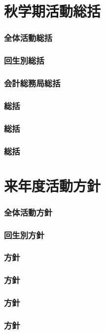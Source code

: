 \part{秋学期活動総括}
\section{全体活動総括}


\section{回生別総括}




\section{会計総務局総括}

\section{\kensuiDepartment{}総括}

\section{\syogaiDepartment{}総括}

\section{\systemDepartment{}総括}


\newpage
\part{来年度活動方針}
\section{全体活動方針}


\section{回生別方針}



\section{\kaisouDepartment{}方針}

\section{\kensuiDepartment{}方針}

\section{\syogaiDepartment{}方針}

\section{\systemDepartment{}方針}
